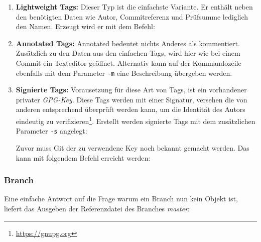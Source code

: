 \begin{enumerate}
\item \textbf{Lightweight Tags:} Dieser Typ ist die einfachste Variante. Er
enthält neben den benötigten Daten wie Autor, Commitreferenz und Prüfsumme
lediglich den Namen. Erzeugt wird er mit dem Befehl:



\item \textbf{Annotated Tags:} Annotated bedeutet nichts Anderes als
kommentiert. Zusätzlich zu den Daten aus den einfachen Tags, wird hier wie bei
einem Commit ein Texteditor geöffnet. Alternativ kann auf der Kommandozeile
ebenfalls mit dem Parameter \texttt{-m} eine Beschreibung übergeben
werden.



\item \textbf{Signierte Tags:} Vorausetzung für diese Art von Tags, ist ein
vorhandener privater \textit{GPG-Key}. Diese Tags werden mit einer Signatur,
versehen die von anderen entsprechend überprüft werden kann, um die Identität
des Autors eindeutig zu verifizieren\footnote{\url{https://gnupg.org}}.
Erstellt werden signierte Tags mit dem zusätzlichen Parameter
\texttt{-s} angelegt:



Zuvor muss Git der zu verwendene Key noch bekannt gemacht werden. Das
kann mit folgendem Befehl erreicht werden:


\end{enumerate}

\subsubsection{Branch}\label{sec:branchobject}
Eine einfache Antwort auf die Frage warum ein Branch nun kein Objekt ist, liefert
das Ausgeben der Referenzdatei des Branches \textit{master}:



